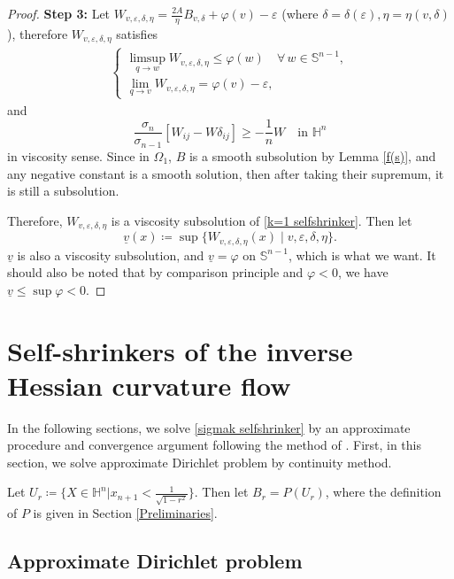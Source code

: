\documentclass[reqno]{amsart}
\theoremstyle{remark}
\theoremstyle{definition}
\numberwithin{equation}{section}
\begin{document}
\begin{proof}
\textbf{Step 3:} Let $W_{v, \varepsilon, \delta, \eta} = \frac{2A}{\eta}B_{v, \delta} + \varphi (v) - \varepsilon$ (where $\delta = \delta (\varepsilon), \eta = \eta (v, \delta)$), therefore $W_{v, \varepsilon, \delta, \eta}$ satisfies 
\begin{align*}
    \begin{cases}
    \underset{q \to w}{\limsup} W_{v, \varepsilon, \delta, \eta} \leqslant \varphi(w) \quad \forall \, w \in \mathbb{S}^{n-1}, \\
    \underset{q \to v}{\lim} W_{v, \varepsilon, \delta, \eta} = \varphi(v) - \varepsilon,
    \end{cases}
\end{align*}
and
\[
\frac{\sigma_n}{\sigma_{n-1}} \left[W_{ij}-W\delta_{ij}\right] \geqslant -\frac{1}{n} W \quad \text{in } \mathbb{H}^{n}
\]
in viscosity sense. Since in $\Omega_1$, $B$ is a smooth subsolution by Lemma \ref{f(s)}, and any negative constant is a smooth solution, then after taking their supremum, it is still a subsolution. 

Therefore, $W_{v,\varepsilon,\delta,\eta}$ is a viscosity subsolution of \eqref{k=1 selfshrinker}. Then let
\[
\underline{v}(x) \coloneqq \sup \{W_{v,\varepsilon,\delta,\eta}(x) \mid v, \varepsilon, \delta, \eta\}.
\]
$\underline{v}$ is also a viscosity subsolution, and $\underline{v} = \varphi$ on $\mathbb{S}^{n-1}$, which is what we want. It should also be noted that by comparison principle and $\varphi < 0$, we have $\underline{v} \leqslant \sup \varphi < 0$.
\end{proof}


\section{Self-shrinkers of the inverse Hessian curvature flow}

In the following sections, we solve \eqref{sigmak selfshrinker} by an approximate procedure and convergence argument following the method of \cite{Entireself-expanders}. First, in this section, we solve approximate Dirichlet problem by continuity method.

Let $U_r \coloneqq \{X \in \mathbb{H}^n | x_{n+1} < \frac{1}{\sqrt{1-r^2}}\}$. Then let $B_r=P(U_r)$, where the definition of $P$ is given in Section \ref{Preliminaries}.   


\subsection{Approximate Dirichlet problem}\label{Approximate Dirichlet problem}
\end{document}

